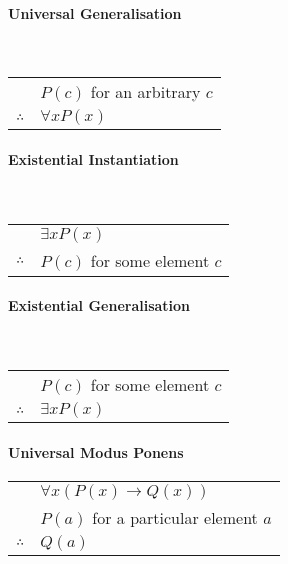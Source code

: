 \documentclass[a4paper, 10pt]{article}
\begin{document}
\begin{multicols}{3}
\paragraph{Universal Generalisation}\mbox{}\\
\begin{tabular}{c@{\,}l@{}}
                & \(P(c)\) for an arbitrary \(c\) \\\cline{2-2}
\(\therefore\)  & \(\forall xP(x)\)
\end{tabular}

\paragraph{Existential Instantiation}\mbox{}\\
\begin{tabular}{c@{\,}l@{}}
                & \(\exists xP(x)\) \\\cline{2-2}
\(\therefore\)  & \(P(c)\) for some element \(c\)
\end{tabular}

\paragraph{Existential Generalisation}\mbox{}\\
\begin{tabular}{c@{\,}l@{}}
                & \(P(c)\) for some element \(c\) \\\cline{2-2}
\(\therefore\)  & \(\exists xP(x)\)
\end{tabular}

\paragraph{Universal Modus Ponens}
\begin{tabular}{c@{\,}l@{}}
                & \(\forall x(P(x)\rightarrow Q(x))\) \\
                & \(P(a)\) for a particular element \(a\) \\\cline{2-2}
\(\therefore\)  & \(Q(a)\)
\end{tabular}

\end{multicols}
\end{document}
